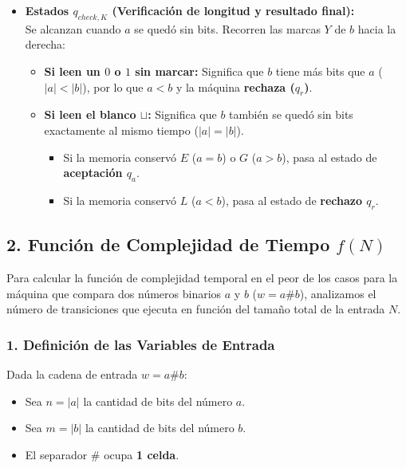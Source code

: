 \begin{itemize}[leftmargin=*]
    \item \textbf{Estados $q_{check,K}$ (Verificación de longitud y resultado final):}\\
    Se alcanzan cuando $a$ se quedó sin bits. Recorren las marcas $Y$ de $b$ hacia la derecha:
    \begin{itemize}[leftmargin=*]
        \item \textbf{Si leen un $0$ o $1$ sin marcar:} Significa que $b$ tiene más bits que $a$ ($|a| < |b|$), por lo que $a < b$ y la máquina \textbf{rechaza ($q_r$)}.
        \item \textbf{Si leen el blanco $\sqcup$:} Significa que $b$ también se quedó sin bits exactamente al mismo tiempo ($|a| = |b|$). 
        \begin{itemize}[leftmargin=*]
            \item Si la memoria conservó $E$ ($a = b$) o $G$ ($a > b$), pasa al estado de \textbf{aceptación $q_a$}.
            \item Si la memoria conservó $L$ ($a < b$), pasa al estado de \textbf{rechazo $q_r$}.
        \end{itemize}
    \end{itemize}
\end{itemize}


\subsection*{2. Función de Complejidad de Tiempo $f(N)$}

Para calcular la función de complejidad temporal en el peor de los casos para la máquina que compara dos números binarios $a$ y $b$ ($w = a\#b$), analizamos el número de transiciones que ejecuta en función del tamaño total de la entrada $N$.

\subsubsection*{1. Definición de las Variables de Entrada}

Dada la cadena de entrada $w = a\#b$:
\begin{itemize}[leftmargin=*]
    \item Sea $n = |a|$ la cantidad de bits del número $a$.
    \item Sea $m = |b|$ la cantidad de bits del número $b$.
    \item El separador $\#$ ocupa \textbf{1 celda}.
\end{itemize}

